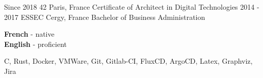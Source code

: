 \documentclass[10pt]{developercv} %
\begin{document}


\begin{entrylist}
	\entry
		{Since 2018}
		{42}
		{Paris, France}
		{Certificate of Architect in Digital Technologies}
	\entry
		{2014 - 2017}
		{ESSEC}
		{Cergy, France}
		{Bachelor of Business Administration}
\end{entrylist}


\begin{minipage}[t]{0.5\textwidth}
	\vspace{-\baselineskip} %


	\textbf{French} - native\\
	\textbf{English} - proficient
\end{minipage}
\hfill
\begin{minipage}[t]{0.5\textwidth}
	\vspace{-\baselineskip} %


	{C, Rust, Docker, VMWare, Git, Gitlab-CI, FluxCD, ArgoCD, Latex, Graphviz, Jira}

\end{minipage}

\end{document}
